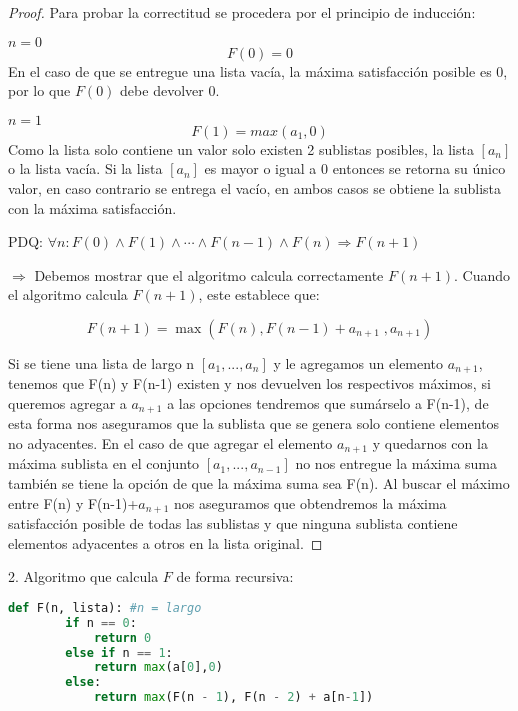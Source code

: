 \documentclass[
	spanish, %
	letterpaper, oneside
]{article}
\begin{document}
\begin{proof}
	Para probar la correctitud se procedera por el principio de inducción:


    $n=0$
    $$F(0) = 0$$
    En el caso de que se entregue una lista vacía, la máxima satisfacción posible es 0, por lo que $F(0)$ debe devolver 0.

	$n=1$
    $$F(1) = max(a_1, 0)$$
    Como la lista solo contiene un valor solo existen 2 sublistas posibles, la lista $[a_n]$ o la lista vacía. Si la lista $[a_n]$ es mayor o igual a 0 entonces se retorna su único valor, en caso contrario se entrega el vacío, en ambos casos se obtiene la sublista con la máxima satisfacción.


    PDQ: $\forall n:  F(0) \land F(1) \land \cdots \land F(n-1) \land F(n) \Rightarrow F(n+1)$
    
    $\Rightarrow$ Debemos mostrar que el algoritmo calcula correctamente $F(n+1)$. Cuando el algoritmo calcula $F(n+1)$, este establece que:

    $$F(n+1) = \max(F(n), F(n-1) + a_{n+1}\;,a_{n+1})$$

    Si se tiene una lista de largo n $[a_1,...,a_n]$ y le agregamos un elemento $a_{n+1}$, tenemos que F(n) y F(n-1) existen y nos devuelven los respectivos máximos, si queremos agregar a $a_{n+1}$ a las opciones tendremos que sumárselo a F(n-1), de esta forma nos aseguramos que la sublista que se genera solo contiene elementos no adyacentes. En el caso de que agregar el elemento $a_{n+1}$ y quedarnos con la máxima sublista en el conjunto $[a_1,...,a_{n-1}]$ no nos entregue la máxima suma también se tiene la opción de que la máxima suma sea F(n). Al buscar el máximo entre F(n) y F(n-1)+$a_{n+1}$ nos aseguramos que obtendremos la máxima satisfacción posible de todas las sublistas y que ninguna sublista contiene elementos adyacentes a otros en la lista original.
    

\end{proof}
\newpage

2. Algoritmo que calcula $F$ de forma recursiva:

\begin{lstlisting}[language=Python]
    def F(n, lista): #n = largo
        if n == 0:
            return 0
        else if n == 1:
            return max(a[0],0)
        else:
            return max(F(n - 1), F(n - 2) + a[n-1])
\end{lstlisting}
\end{document}
